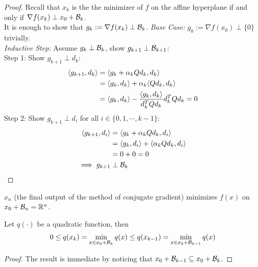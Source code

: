 \documentclass{article}
\begin{document}
	\begin{proof}
		Recall that $x_k$ is the the minimizer of $f$ on the affine hyperplane if and only if $\nabla f(x_k) \perp x_0 + \mathcal{{B}}_k$. \\
		It is enough to show that $g_k := \nabla f(x_k) \perp \mathcal{{B}}_k$.
		\emph{Base Case:} $g_0 := \nabla f(x_0) \perp \{0\}$ trivially. \\
		\emph{Inductive Step:} Assume $g_k \perp \mathcal{{B}}_k$, show $g_{k+1} \perp \mathcal{{B}}_{k+1}$: \\
		Step 1: Show $g_{k+1} \perp d_k$:
		\begin{align}
			\langle {g_{k+1}}, {d_k} \rangle &= \langle {g_{k} + \alpha_k Q d_k}, {d_k} \rangle \\
			&= \langle {g_{k}}, {d_k} \rangle + \alpha_k \langle {Q d_k}, {d_k} \rangle \\
			&= \langle {g_{k}}, {d_k} \rangle - \frac{\langle {g_k}, {d_k} \rangle}{d^T_k Q d_k} d_k^T Q d_k
			= 0
		\end{align}
		Step 2: Show $g_{k+1} \perp d_i$ for all $i \in \{0, 1, \cdots, k-1\}$:
		\begin{align}
			\langle {g_{k+1}}, {d_i} \rangle &= \langle {g_{k} + \alpha_k Q d_k}, {d_i} \rangle \\
			&= \langle {g_{k}}, {d_i} \rangle + \langle {\alpha_k Q d_k}, {d_i} \rangle \\
			&= 0 + 0 = 0 \\
			\implies g_{k+1} &\perp \mathcal{{B}}_k
		\end{align}
	\end{proof}
	
	\begin{corollary}
		$x_n$ (the final output of the method of conjugate gradient) minimizes $f(x)$ on $x_0 + \mathcal{{B}}_n = \mathbb{R}^n$.
	\end{corollary}
	
	\begin{corollary}
		Let $q(\cdot)$ be a quadratic function, then
		\begin{align}
			0 \leq q(x_k) = \min_{x \in x_0 + \mathcal{{B}}_k} q(x) \leq q(x_{k-1}) = \min_{x \in x_0 + \mathcal{{B}}_{k-1}} q(x)
		\end{align}
	\end{corollary}
	
	\begin{proof}
		The result is immediate by noticing that $x_0 + \mathcal{{B}}_{k-1} \subseteq x_0 + \mathcal{{B}}_k$.
	\end{proof}
	
\end{document}
